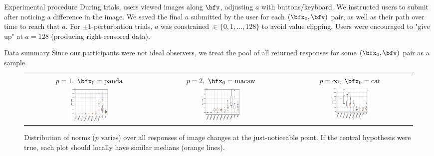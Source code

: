 \documentclass[final,notheorems]{beamer}
\newlength{\colwidth}
\begin{document}
\begin{frame}[t]
\begin{columns}[t]
\begin{column}{\colwidth}
\begin{block}{Experimental procedure}
    During trials, users viewed images along $\bfv$, adjusting $a$ with buttons/keyboard.
    We instructed users to submit after noticing a difference in the image.
    We saved the final $a$ submitted by the user for each $(\bfx_0, \bfv)$ pair, as well as their path over time to reach that $a$.
    For $\pm1$-perturbation trials, $a$ was constrained $\in\{0,1,\ldots,128\}$ to avoid value clipping. Users were encouraged to "give up" at $a=128$ (producing right-censored data).

  \end{block}

  \begin{block}{Data summary}
    Since our participants were not ideal observers, we treat the pool of all returned responses for some $(\bfx_0, \bfv)$ pair as a sample.
\begin{figure}[h]
  \begin{center}
    \begin{tabular}{ccc}
      $p=1,\ \bfx_0=\text{panda}$ & $p=2,\ \bfx_0=\text{macaw}$ & $p=\infty,\ \bfx_0=\text{cat}$ \\
      \includegraphics[width=0.3\textwidth]{fig/pixel_1_norm_boxplot_panda.eps} &
      \includegraphics[width=0.3\textwidth]{fig/pixel_2_norm_boxplot_macaw.eps} &
      \includegraphics[width=0.3\textwidth]{fig/pixel_inf_norm_boxplot_cat.eps}
    \end{tabular}
  \end{center}
  \caption{Distribution of norms ($p$ varies) over all responses of image changes at the just-noticeable point. If the central hypothesis were true, each plot should locally have similar medians (orange lines).}
  \label{fig:Lp_excerpt}
\end{figure}
  \end{block}
\end{column}


\end{columns}
\end{frame}
\end{document}
